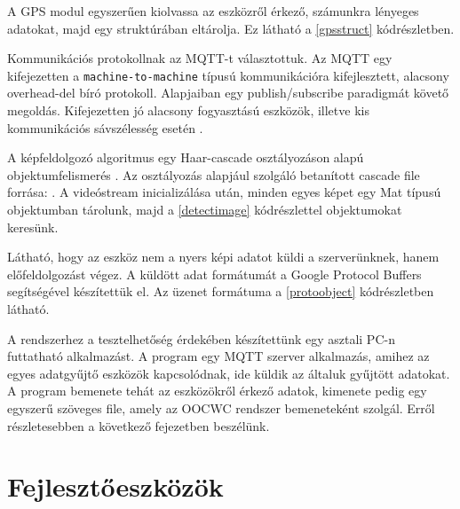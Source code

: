 \documentclass[a4paper,12pt]{report}
\begin{document}


A GPS modul egyszerűen kiolvassa az eszközről érkező, számunkra lényeges adatokat, majd egy struktúrában eltárolja. Ez látható a \ref{gpsstruct} kódrészletben.



Kommunikációs protokollnak az MQTT-t választottuk. Az MQTT egy kifejezetten a \texttt{machine-to-machine} típusú kommunikációra kifejlesztett, alacsony overhead-del bíró protokoll. Alapjaiban egy publish/subscribe paradigmát követő megoldás. Kifejezetten jó alacsony fogyasztású eszközök, illetve kis kommunikációs sávszélesség esetén \cite{mqtt}. 

A képfeldolgozó algoritmus egy Haar-cascade osztályozáson alapú objektumfelismerés \cite{violacascade} \cite{haaremp}. Az osztályozás alapjául szolgáló betanított cascade file forrása: \cite{cascade}. A videóstream inicializálása után, minden egyes képet egy Mat típusú objektumban tárolunk, majd a \ref{detectimage} kódrészlettel objektumokat keresünk. 



Látható, hogy az eszköz nem a nyers képi adatot küldi a szerverünknek, hanem előfeldolgozást végez. A küldött adat formátumát a Google Protocol Buffers segítségével készítettük el. Az üzenet formátuma a \ref{protoobject} kódrészletben látható. 



A rendszerhez a tesztelhetőség érdekében készítettünk egy asztali PC-n futtatható alkalmazást. A program egy MQTT szerver alkalmazás, amihez az egyes adatgyűjtő eszközök kapcsolódnak, ide küldik az általuk gyűjtött adatokat. A program bemenete tehát az eszközökről érkező adatok, kimenete pedig egy egyszerű szöveges file, amely az OOCWC rendszer bemeneteként szolgál. Erről részletesebben a következő fejezetben beszélünk.

\section{Fejlesztőeszközök}
\label{dev}
\end{document}
